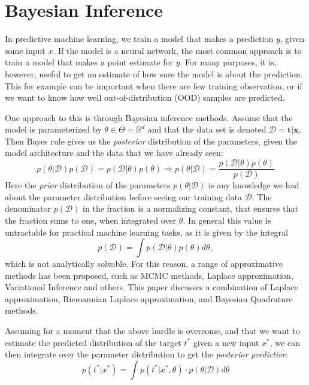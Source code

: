 \section{Bayesian Inference}
In predictive machine learning, we train a model that makes a prediction $y$, given some input $x$. If the model is a neural network, the most common approach is to train a model that makes a point estimate for $y$. For many purposes, it is, however, useful to get an estimate of how sure the model is about the prediction. This for example can be important when there are few training observation, or if we want to know how well out-of-distribution (OOD) samples are predicted.

One approach to this is through Bayesian inference methods. Assume that the model is parameterized by $\theta\in \Theta = \mathbb R^d$ and that the data set is denoted $\mathcal{D} = \bm t \vert \bm x$.
Then Bayes rule gives us the \emph{posterior} distribution of the parameters, given the model architecture and the data that we have already seen:
\begin{equation}
p(\theta\vert \mathcal{D} ) p(\mathcal{D} ) = p(\mathcal{D} \vert\theta) p(\theta) \Rightarrow
p(\theta\vert \mathcal{D} ) = \frac{p(\mathcal{D} \vert\theta) p(\theta) }{p(\mathcal{D})}
\label{eq:bayesrule}
\end{equation}
Here the \emph{prior} distribution of the parameters $p(\theta\vert \mathcal{D} )$ is any knowledge we had about the parameter distribution before seeing our training data $\mathcal{D}$. The denominator  $p(\mathcal{D})$ in the fraction is a normalizing constant, that ensures that the fraction sums to one, when integrated over $\theta$. In general this value is untractable for practical machine learning tasks, as it is given by the integral
$$p(\mathcal{D}) = \int p(\mathcal{D} \vert \theta) p(\theta) d\theta, 
$$
which is not analytically solvable. %
For this reason, a range of approximative methods has been proposed, such as MCMC methods, Laplace approximation, Variational Inference and others. This paper discusses a combination of Laplace approximation, Riemannian Laplace approximation, and Bayesian Quadrature methods. 

Assuming for a moment that the above hurdle is overcome, and that we want to estimate the predicted distribution of the target $t^\ast$ given a new input $x^\ast$, we can then integrate over the parameter distribution to get the \emph{posterior predictive}:
\begin{equation}
p(t^\ast\vert x^\ast) = \int p(t^\ast\vert x^\ast, \theta)\cdot p(\theta\vert \mathcal{D})d\theta
\label{eq:posterior_predictive}
\end{equation}
